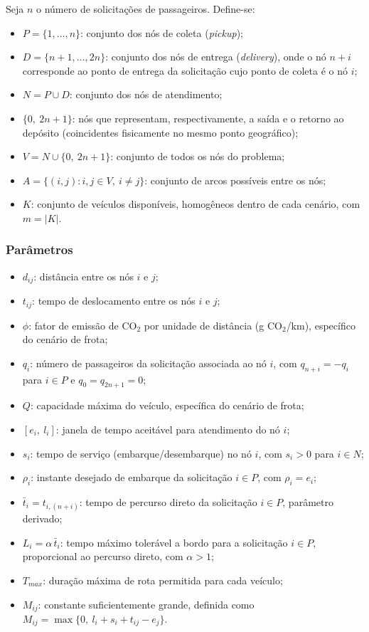 \documentclass[12pt,a4paper]{article}
\theoremstyle{plain}
\begin{document}
Seja $n$ o número de solicitações de passageiros. Define-se:
\begin{itemize}
    \item $P = \{1, \dots, n\}$: conjunto dos nós de coleta (\textit{pickup});
    \item $D = \{n+1, \dots, 2n\}$: conjunto dos nós de entrega (\textit{delivery}), onde o nó $n+i$ corresponde ao ponto de entrega da solicitação cujo ponto de coleta é o nó $i$;
    \item $N = P \cup D$: conjunto dos nós de atendimento;
    \item $\{0,\ 2n+1\}$: nós que representam, respectivamente, a saída e o retorno ao depósito (coincidentes fisicamente no mesmo ponto geográfico);
    \item $V = N \cup \{0,\ 2n+1\}$: conjunto de todos os nós do problema;
    \item $A = \{(i,j) : i,j \in V,\ i \neq j\}$: conjunto de arcos possíveis entre os nós;
    \item $K$: conjunto de veículos disponíveis, homogêneos dentro de cada cenário, com $m = |K|$.
\end{itemize}

\subsubsection{Parâmetros}

\begin{itemize}
    \item $d_{ij}$: distância entre os nós $i$ e $j$;
    \item $t_{ij}$: tempo de deslocamento entre os nós $i$ e $j$;
    \item $\phi$: fator de emissão de $\text{CO}_2$ por unidade de distância (g $\text{CO}_2$/km), específico do cenário de frota;
    \item $q_i$: número de passageiros da solicitação associada ao nó $i$, com $q_{n+i} = -q_i$ para $i \in P$ e $q_0 = q_{2n+1} = 0$;
    \item $Q$: capacidade máxima do veículo, específica do cenário de frota;
    \item $[e_i,\ l_i]$: janela de tempo aceitável para atendimento do nó $i$;
    \item $s_i$: tempo de serviço (embarque/desembarque) no nó $i$, com $s_i > 0$ para $i \in N$;
    \item $\rho_i$: instante desejado de embarque da solicitação $i \in P$, com $\rho_i = e_i$;
    \item $\bar{t}_i = t_{i,(n+i)}$: tempo de percurso direto da solicitação $i \in P$, parâmetro derivado;
    \item $L_i = \alpha\,\bar{t}_i$: tempo máximo tolerável a bordo para a solicitação $i \in P$, proporcional ao percurso direto, com $\alpha > 1$;
    \item $T_{max}$: duração máxima de rota permitida para cada veículo;
    \item $M_{ij}$: constante suficientemente grande, definida como $M_{ij} = \max\{0,\ l_i + s_i + t_{ij} - e_j\}$.
\end{itemize}
\end{document}
